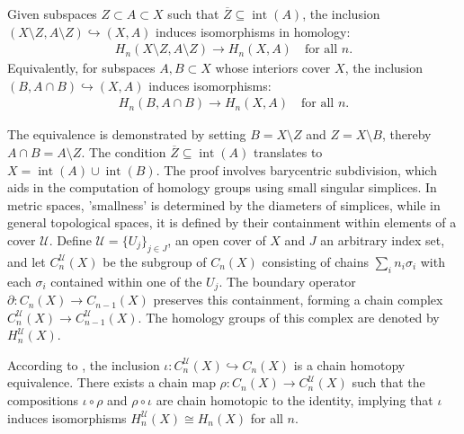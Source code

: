 \begin{theorem}[Excision]
	{\cite[\S 2.20]{hatcher2005algebraic} \label{excisiontheorem} Given subspaces $Z \subset A \subset X$ such that $\overline{Z}\subseteq \operatorname{int}(A)$, the inclusion $(X\setminus Z, A\setminus Z) \hookrightarrow (X, A)$ induces isomorphisms in homology}:
	\begin{align}
		H_{n}(X\setminus Z, A\setminus Z) \to H_{n}(X, A) \quad \text{for all }n. 
	\end{align}
	Equivalently, for subspaces $A, B \subset X$ whose interiors cover $X$, the
	inclusion $(B, A \cap B) \hookrightarrow (X, A)$ induces isomorphisms:
	\begin{align}
		H_{n}(B, A \cap B) \to H_{n}(X, A) \quad \text{for all }n. 
	\end{align}
\end{theorem}

The equivalence is demonstrated by setting \( B = X \setminus Z \) and \( Z = X \setminus B \), thereby \( A \cap B = A \setminus Z \). The condition \( \overline{Z} \subseteq \operatorname{int}(A) \) translates to \( X = \operatorname{int}(A) \cup \operatorname{int}(B) \). The proof involves barycentric subdivision, which aids in the computation of homology groups using small singular simplices. In metric spaces, 'smallness' is determined by the diameters of simplices, while in general topological spaces, it is defined by their containment within elements of a cover \( \mathcal{U} \). Define \( \mathcal{U} = \{U_{j}\}_{j \in J} \), an open cover of \( X \) and $J$ an arbitrary index set, and let \( C^{\mathcal{U}}_{n}(X) \) be the subgroup of \( C_{n}(X) \) consisting of chains \( \sum_{i} n_{i} \sigma_{i} \) with each \( \sigma_{i} \) contained within one of the \( U_{j} \). The boundary operator \( \partial: C_{n}(X) \to C_{n-1}(X) \) preserves this containment, forming a chain complex \( C^{\mathcal{U}}_{n}(X) \to C^{\mathcal{U}}_{n-1}(X) \). The homology groups of this complex are denoted by \( H^{\mathcal{U}}_{n}(X) \).

\begin{proposition}
	\label{baryproof}
	According to \cite[\S 2.21]{hatcher2005algebraic}, the inclusion \( \iota : C^{\mathcal{U}}_n(X) \hookrightarrow C_n(X) \) is a chain homotopy equivalence. There exists a chain map \( \rho : C_n(X) \to C^{\mathcal{U}}_n(X) \) such that the compositions \( \iota \circ \rho \) and \( \rho \circ \iota \) are chain homotopic to the identity, implying that \( \iota \) induces isomorphisms \( H^{\mathcal{U}}_n(X) \cong H_n(X) \) for all \( n \).
\end{proposition}

